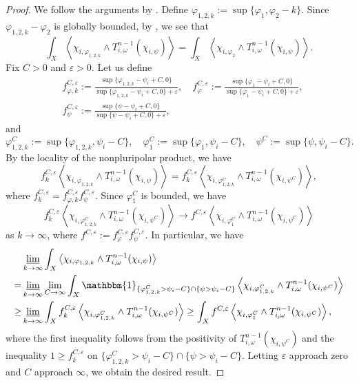 \documentclass{amsart}
\numberwithin{equation}{section}
\theoremstyle{plain}
\theoremstyle{definition}
\theoremstyle{remark}
\begin{document}
\begin{proof}
    We follow the arguments by \cite[Section 2]{DDL}. Define $\varphi_{1,2,k}:=\sup\{\varphi_1,\varphi_2-k\}$. Since $\varphi_{1,2,k}-\varphi_2$ is globally bounded, by \cite[Proposition 2.1]{DDL}, we see that
    $$\int_X\left\langle\chi_{i,\varphi_{1,2,k}}\wedge T^{n-1}_{i,\omega}(\chi_{i,\psi})\right\rangle
    =\int_X\left\langle\chi_{i,\varphi_2}\wedge T^{n-1}_{i,\omega}(\chi_{i,\psi})\right\rangle.$$
    Fix $C>0$ and $\varepsilon>0$. Let us define
    \begin{align*}
        &f_{\varphi,k}^{C,\varepsilon}:=\frac{\sup\{\varphi_{1,2,k}-\psi_i+C,0\}}{\sup\{\varphi_{1,2,k}-\psi_i+C,0\}+\varepsilon}, \quad f_\varphi^{C,\varepsilon}:=\frac{\sup\{\varphi_1-\psi_i+C,0\}}{\sup\{\varphi_1-\psi_i+C,0\}+\varepsilon},\\
        &f_{\psi}^{C,\varepsilon}:=\frac{\sup\{\psi-\psi_i+C,0\}}{\sup\{\psi-\psi_i+C,0\}+\varepsilon}, 
    \end{align*}
    and $$\varphi_{1,2,k}^C:=\sup\{\varphi_{1,2,k},\psi_i-C\},\quad
    \varphi_1^C:=\sup\{\varphi_1,\psi_i-C\}, \quad\psi^C:=\sup\{\psi,\psi_i-C\}.$$  
    By the locality of the nonpluripolar product, we have
    $$f_{k}^{C,\varepsilon}\left\langle\chi_{i,\varphi_{1,2,k}}\wedge T^{n-1}_{i,\omega}(\chi_{i,\psi})\right\rangle=f_{k}^{C,\varepsilon}\left\langle\chi_{i,\varphi_{1,2,k}^C}\wedge T^{n-1}_{i,\omega}(\chi_{i,\psi^C})\right\rangle,$$
    where $f_{k}^{C,\varepsilon}=f_{\varphi,k}^{C,\varepsilon}f_{\psi}^{C,\varepsilon}$. Since $\varphi_{1}^C$ is bounded, we have
    $$f_{k}^{C,\varepsilon}\left\langle\chi_{i,\varphi_{1,2,k}^C}\wedge T^{n-1}_{i,\omega}(\chi_{i,\psi^C})\right\rangle\to f^{C,\varepsilon}\left\langle\chi_{i,\varphi_{1}^C}\wedge T^{n-1}_{i,\omega}(\chi_{i,\psi^C})\right\rangle$$
    as $k\to\infty$, where $f^{C,\varepsilon}:=f_{\varphi}^{C,\varepsilon}f_\psi^{C,\varepsilon}$. In particular, we have 
    \begin{equation*}
    \begin{split}
    &\varliminf_{k\to\infty}\int_X\left\langle\chi_{i,\varphi_{1,2,k}}\wedge T^{n-1}_{i,\omega}(\chi_{i,\psi})\right\rangle\\
    =&\varliminf_{k\to\infty}\lim_{C\to\infty}\int_X \mathbbm{1}_{\{\varphi_{1,2,k}^C >\psi_i-C\}\cap\{\psi>\psi_i-C\}}\left\langle\chi_{i,\varphi_{1,2,k}^C}\wedge T^{n-1}_{i,\omega}(\chi_{i,\psi^C})\right\rangle\\
    \ge&
    \varliminf_{k\to\infty}\int_X f_{k}^{C,\varepsilon}\left\langle\chi_{i,\varphi_{1,2,k}^C}\wedge T^{n-1}_{i,\omega}(\chi_{i,\psi^C})\right\rangle
    \ge
    \int_Xf^{C,\varepsilon}\left\langle\chi_{i,\varphi_{1}^C}\wedge T^{n-1}_{i,\omega}(\chi_{i,\psi^C})\right\rangle,
    \end{split}
    \end{equation*}
    where the first inequality follows from the positivity of $T^{n-1}_{i,\omega}(\chi_{i,\psi^C})$ and the inequality $1\ge f_k^{C,\varepsilon}$ on $\{\varphi_{1,2,k}^C >\psi_i-C\}\cap\{\psi>\psi_i-C\}$. 
    Letting $\varepsilon$ approach zero and $C$ approach $\infty$, we obtain the desired result.
\end{proof}
\end{document}
